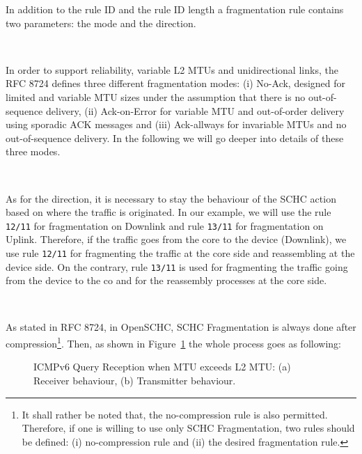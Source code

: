 In addition to the rule ID and the rule ID length a fragmentation rule contains two parameters: the mode and the direction.

~

In order to support reliability, variable L2 MTUs and unidirectional links, the RFC 8724 defines three different fragmentation modes: (i) No-Ack, designed for limited and variable MTU sizes under the assumption that there is no out-of-sequence delivery, (ii) Ack-on-Error for variable MTU and out-of-order delivery using sporadic ACK messages and (iii) Ack-allways for invariable MTUs and no out-of-sequence delivery.
In the following we will go deeper into details of these three modes.

~

As for the direction, it is necessary to stay the behaviour of the SCHC action based on where the traffic is originated.
In our example, we will use the rule \texttt{12/11} for fragmentation on Downlink and rule \texttt{13/11} for fragmentation on Uplink.
Therefore, if the traffic goes from the core to the device (Downlink), we use rule \texttt{12/11} for fragmenting the traffic at the core side and reassembling at the device side.
On the contrary, rule \texttt{13/11} is used for fragmenting the traffic going from the device to the co and for the reassembly processes at the core side.

~

As stated in RFC 8724, in OpenSCHC, SCHC Fragmentation is always done after compression\footnote{It shall rather be noted that, the no-compression rule is also permitted. Therefore, if one is willing to use only SCHC Fragmentation, two rules should be defined: (i) no-compression rule and (ii) the desired fragmentation rule.}. 
Then, as shown in Figure~\ref{fig-icmpv6_query} the whole process goes as following:

\begin{figure}[!tbp]
  \begin{minipage}[b]{0.33\columnwidth}
  \centering
    
  \end{minipage}
  \hfill
  \begin{minipage}[b]{0.33\columnwidth}
  \centering
    
  \end{minipage}
\caption{ICMPv6 Query Reception when MTU exceeds L2 MTU: (a) Receiver behaviour, (b) Transmitter behaviour.} \label{fig-icmpv6_query}
\end{figure}

